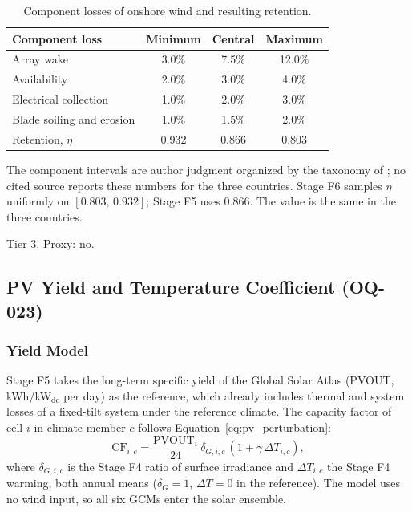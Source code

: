 \begin{table}[htbp]
    \centering
    \caption{Component losses of onshore wind and resulting retention.}
    \label{tab:g1_wind_losses}
    \small
    \begin{tabular}{lccc}
        \toprule
        Component loss & Minimum & Central & Maximum \\
        \midrule
        Array wake                & 3.0\% & 7.5\% & 12.0\% \\
        Availability              & 2.0\% & 3.0\% & 4.0\%  \\
        Electrical collection     & 1.0\% & 2.0\% & 3.0\%  \\
        Blade soiling and erosion & 1.0\% & 1.5\% & 2.0\%  \\
        \midrule
        Retention, $\eta$ & 0.932 & 0.866 & 0.803 \\
        \bottomrule
    \end{tabular}
\end{table}

The component intervals are author judgment organized by the taxonomy of
\cite{leefields2021}; no cited source reports these numbers for the three
countries. Stage F6 samples $\eta$ uniformly on $[0.803,\,0.932]$; Stage
F5 uses 0.866. The value is the same in the three countries.

Tier 3. Proxy: no.

\subsection{PV Yield and Temperature Coefficient (OQ-023)}
\label{subsec:g1_pv_thermal}

\subsubsection{Yield Model}

Stage F5 takes the long-term specific yield of the Global Solar Atlas
(PVOUT, kWh/kW$_{\mathrm{dc}}$ per day) \cite{esmap2019gsa} as the reference, which already
includes thermal and system losses of a fixed-tilt system under the
reference climate. The capacity factor of cell $i$ in climate member $c$
follows Equation~\ref{eq:pv_perturbation}:
\begin{equation}
    \mathrm{CF}_{i,c} = \frac{\mathrm{PVOUT}_i}{24}\,
      \delta_{G,i,c}\,(1+\gamma\,\Delta T_{i,c}),
    \label{eq:g1_pv_cf}
\end{equation}
where $\delta_{G,i,c}$ is the Stage F4 ratio of surface irradiance and
$\Delta T_{i,c}$ the Stage F4 warming, both annual means
($\delta_G=1$, $\Delta T=0$ in the reference). The model uses no wind
input, so all six GCMs enter the solar ensemble.

